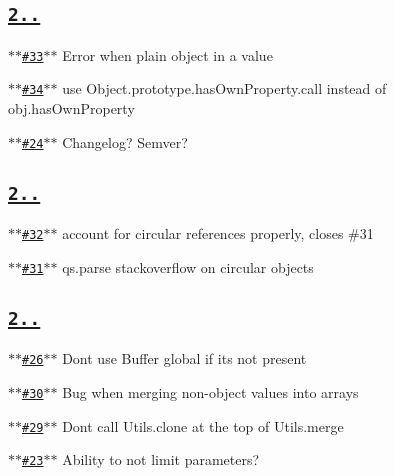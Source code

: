 \subsection*{\href{https://github.com/ljharb/qs/issues?milestone=11&state=closed}{\tt {\bfseries 2..}}}


\begin{DoxyItemize}
\item \href{https://github.com/ljharb/qs/issues/33}{\tt $\ast$$\ast$\#33$\ast$$\ast$} Error when plain object in a value
\item \href{https://github.com/ljharb/qs/issues/34}{\tt $\ast$$\ast$\#34$\ast$$\ast$} use Object.\+prototype.\+has\+Own\+Property.\+call instead of obj.\+has\+Own\+Property
\item \href{https://github.com/ljharb/qs/issues/24}{\tt $\ast$$\ast$\#24$\ast$$\ast$} Changelog? Semver?
\end{DoxyItemize}

\subsection*{\href{https://github.com/ljharb/qs/issues?milestone=10&state=closed}{\tt {\bfseries 2..}}}


\begin{DoxyItemize}
\item \href{https://github.com/ljharb/qs/issues/32}{\tt $\ast$$\ast$\#32$\ast$$\ast$} account for circular references properly, closes \#31
\item \href{https://github.com/ljharb/qs/issues/31}{\tt $\ast$$\ast$\#31$\ast$$\ast$} qs.\+parse stackoverflow on circular objects
\end{DoxyItemize}

\subsection*{\href{https://github.com/ljharb/qs/issues?milestone=9&state=closed}{\tt {\bfseries 2..}}}


\begin{DoxyItemize}
\item \href{https://github.com/ljharb/qs/issues/26}{\tt $\ast$$\ast$\#26$\ast$$\ast$} Don\textquotesingle{}t use Buffer global if it\textquotesingle{}s not present
\item \href{https://github.com/ljharb/qs/issues/30}{\tt $\ast$$\ast$\#30$\ast$$\ast$} Bug when merging non-\/object values into arrays
\item \href{https://github.com/ljharb/qs/issues/29}{\tt $\ast$$\ast$\#29$\ast$$\ast$} Don\textquotesingle{}t call Utils.\+clone at the top of Utils.\+merge
\item \href{https://github.com/ljharb/qs/issues/23}{\tt $\ast$$\ast$\#23$\ast$$\ast$} Ability to not limit parameters?
\end{DoxyItemize}

